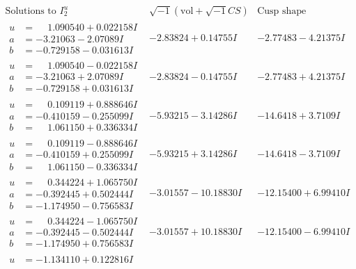 \documentclass[1p]{elsarticle_modified}
\theoremstyle{definition}
\newcommand{\I}{\sqrt{-1}}
\begin{document}
$$\begin{array}{c|c|c}  
\text{Solutions to }I^u_{2}& \I (\text{vol} + \sqrt{-1}CS) & \text{Cusp shape}\\
 \hline 
\begin{aligned}
u &= \phantom{-}1.090540 + 0.022158 I \\
a &= -3.21063 - 2.07089 I \\
b &= -0.729158 - 0.031613 I\end{aligned}
 & -2.83824 + 0.14755 I & -2.77483 - 4.21375 I \\ \hline\begin{aligned}
u &= \phantom{-}1.090540 - 0.022158 I \\
a &= -3.21063 + 2.07089 I \\
b &= -0.729158 + 0.031613 I\end{aligned}
 & -2.83824 - 0.14755 I & -2.77483 + 4.21375 I \\ \hline\begin{aligned}
u &= \phantom{-}0.109119 + 0.888646 I \\
a &= -0.410159 - 0.255099 I \\
b &= \phantom{-}1.061150 + 0.336334 I\end{aligned}
 & -5.93215 - 3.14286 I & -14.6418 + 3.7109 I \\ \hline\begin{aligned}
u &= \phantom{-}0.109119 - 0.888646 I \\
a &= -0.410159 + 0.255099 I \\
b &= \phantom{-}1.061150 - 0.336334 I\end{aligned}
 & -5.93215 + 3.14286 I & -14.6418 - 3.7109 I \\ \hline\begin{aligned}
u &= \phantom{-}0.344224 + 1.065750 I \\
a &= -0.392445 + 0.502444 I \\
b &= -1.174950 - 0.756583 I\end{aligned}
 & -3.01557 - 10.18830 I & -12.15400 + 6.99410 I \\ \hline\begin{aligned}
u &= \phantom{-}0.344224 - 1.065750 I \\
a &= -0.392445 - 0.502444 I \\
b &= -1.174950 + 0.756583 I\end{aligned}
 & -3.01557 + 10.18830 I & -12.15400 - 6.99410 I \\ \hline\begin{aligned}
u &= -1.134110 + 0.122816 I \\

\end{aligned}
\end{array}$$
\end{document}
